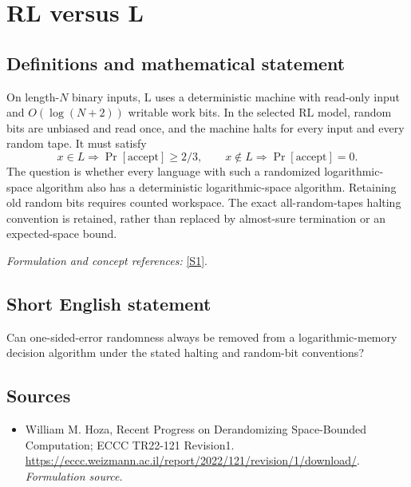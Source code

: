 \documentclass[11pt]{article}
\begin{document}
\section*{\texorpdfstring{RL versus L}{RL versus L}}\label{253}
\subsection{Definitions and mathematical statement}
On length-$N$ binary inputs, $\mathrm L$ uses a deterministic machine with read-only input and $O(\log(N+2))$ writable work bits. In the selected $\mathrm{RL}$ model, random bits are unbiased and read once, and the machine halts for every input and every random tape. It must satisfy
\[
 x\in L\Rightarrow\Pr[\mathrm{accept}]\ge2/3,
 \qquad x\notin L\Rightarrow\Pr[\mathrm{accept}]=0.
\]
The question is whether every language with such a randomized logarithmic-space algorithm also has a deterministic logarithmic-space algorithm. Retaining old random bits requires counted workspace. The exact all-random-tapes halting convention is retained, rather than replaced by almost-sure termination or an expected-space bound.
\par\smallskip\textit{Formulation and concept references:} \href{https://eccc.weizmann.ac.il/report/2022/121/revision/1/download/}{[S1]}.

\subsection{Short English statement}
Can one-sided-error randomness always be removed from a logarithmic-memory decision algorithm under the stated halting and random-bit conventions?
\subsection{Sources}
\begin{itemize}
\item[S1]William M. Hoza, Recent Progress on Derandomizing Space-Bounded Computation; ECCC TR22-121 Revision1.
\url{https://eccc.weizmann.ac.il/report/2022/121/revision/1/download/}.
\textit{Formulation source.}
\end{itemize}
\end{document}
